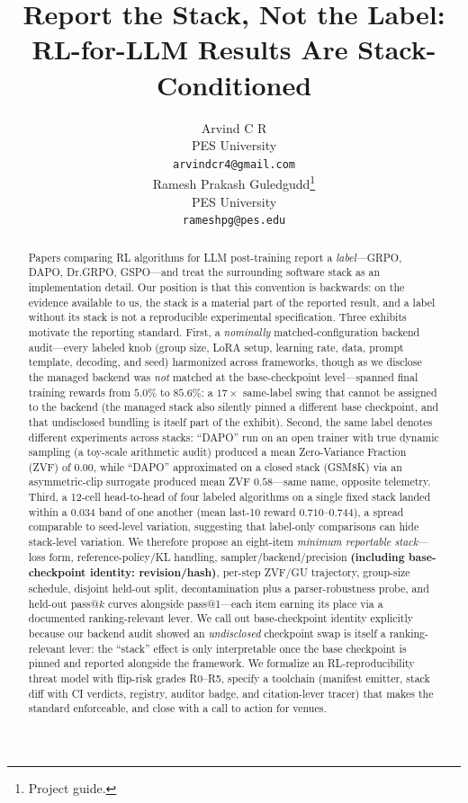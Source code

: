 \documentclass{article}  \usepackage[preprint,nonatbib]{neurips_2026} \usepackage[numbers]{natbib}
\title{Report the Stack, Not the Label:\\
       RL-for-LLM Results Are Stack-Conditioned}
\author{
  Arvind C R \\
  PES University\\
  \texttt{arvindcr4@gmail.com} \\
  \And
  Ramesh Prakash Guledgudd\thanks{Project guide.} \\
  PES University\\
  \texttt{rameshpg@pes.edu} \\
}
\begin{document}
\sloppy {}  \hfuzz=2pt
\maketitle
\begin{abstract}
Papers comparing RL algorithms for LLM post-training report a \emph{label}---GRPO,
DAPO, Dr.GRPO, GSPO---and treat the surrounding software stack as an
implementation detail. Our position is that this convention is backwards: on the
evidence available to us, the stack is a material part of the reported result,
and a label without its stack is not a reproducible experimental
specification. Three exhibits motivate the reporting standard. First, a \emph{nominally} matched-configuration backend
audit---every labeled knob (group size, LoRA setup, learning rate, data, prompt
template, decoding, and seed) harmonized across frameworks, though as we disclose
the managed backend was \emph{not} matched at the base-checkpoint level---spanned
final training rewards from $5.0\%$ to $85.6\%$: a $17\times$ same-label swing
that cannot be assigned to the backend (the managed stack
also silently pinned a different base checkpoint, and that undisclosed bundling
is itself part of the exhibit). Second, the same label denotes different
experiments across stacks: ``DAPO'' run on an open trainer with true dynamic
sampling (a toy-scale arithmetic audit) produced a mean Zero-Variance Fraction
(ZVF) of $0.00$, while ``DAPO'' approximated on a closed stack (GSM8K) via an
asymmetric-clip surrogate produced mean ZVF $0.58$---same name, opposite
telemetry. Third, a 12-cell head-to-head of four labeled algorithms on a single
fixed stack landed within a $0.034$ band of one another (mean last-10 reward
$0.710$--$0.744$), a spread comparable to seed-level variation, suggesting
that label-only comparisons can hide stack-level variation. We therefore
propose an eight-item \emph{minimum reportable
stack}---loss form, reference-policy/KL handling, sampler/backend/precision
\textbf{(including base-checkpoint identity: revision/hash)}, per-step ZVF/GU
trajectory, group-size schedule, disjoint held-out split,
decontamination plus a parser-robustness probe, and held-out pass@$k$
curves alongside pass@1---each item earning its place via a
documented ranking-relevant lever. We call out base-checkpoint identity explicitly
because our backend audit showed an \emph{undisclosed} checkpoint swap is itself a
ranking-relevant lever: the ``stack'' effect is only interpretable once the base
checkpoint is pinned and reported alongside the framework. We formalize an RL-reproducibility threat
model with flip-risk grades R0--R5, specify a toolchain (manifest emitter, stack
diff with CI verdicts, registry, auditor badge, and citation-lever tracer) that
makes the standard enforceable, and close with a call to action for venues.
\end{abstract}
 
\end{document}

